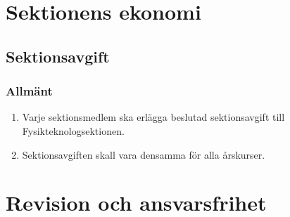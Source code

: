 \documentclass[11pt,a4paper]{article}
\begin{document}
\newpage

\section{Sektionens ekonomi}
\subsection{Sektionsavgift}
\subsubsection{Allmänt}
\begin{enumerate}[\thesubsection.1]

  \item Varje sektionsmedlem ska erlägga beslutad sektionsavgift till
  Fysikteknologsektionen.

  \item Sektionsavgiften skall vara densamma för alla årskurser.

\end{enumerate}



\section{Revision och ansvarsfrihet}
\end{document}
